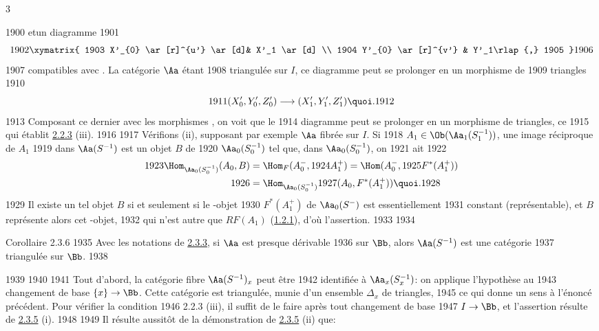 3	\documentclass[10pt]{../fichiers-configuration-latex/smfart}
\begin{document}
  1900	et\pageoriginale un diagramme
  1901	\[
  1902	\xymatrix{
  1903	X'_{0}  \ar[r]^{u'} \ar[d]& X'_1 \ar[d] \\
  1904	Y'_{0}  \ar[r]^{v'} & Y'_1\rlap{,}
  1905	}
  1906	\]
  1907	compatibles avec . La catégorie $\Aa$ étant
  1908	triangulée sur $I$, ce diagramme peut se prolonger en un morphisme de
  1909	triangles
  1910	\[
  1911	(X'_0,Y'_0,Z'_0)\longrightarrow (X'_1, Y'_1, Z'_1){\quoi}.
  1912	\]
  1913	Composant ce dernier avec les morphismes , on voit que le
  1914	diagramme  peut se prolonger en un morphisme de triangles, ce
  1915	qui établit \hyperref[XVII.def2.2.3]{2.2.3} (iii).
  1916	
  1917	Vérifions (ii), supposant par exemple $\Aa$ fibrée sur $I$. Si
  1918	$A_1\in \Ob (\Aa_1(S^{-1}_1))$, une image réciproque de $A_1$
  1919	dans $\Aa(S^{-1})$ est un objet $B$ de
  1920	$\Aa_0(S^{-1}_0)$ tel que, dans $\Aa_0(S^{-1}_0)$, on
  1921	ait
  1922	\begin{align*}
  1923	\Hom_{\Aa_0(S^{-1}_0)}(A_0,B) & =\Hom_F(A^{-}_0,
  1924	A^{+}_1)=\Hom(A^{-}_0,
  1925	F^{\ast}(A^{+}_1))\\
  1926	&=\Hom_{\Aa_0(S^{-1}_0)}
  1927	(A_0,F^{\ast}(A^{+}_1)){\quoi}.
  1928	\end{align*}
  1929	Il existe un tel objet $B$ si et seulement si le \iInd-objet
  1930	$F^{\ast}(A^{+}_1)$ de $\Aa_0(S^{-})$ est essentiellement
  1931	constant (\ie représentable), et $B$ représente alors cet \iind-objet,
  1932	qui n'est autre que $RF(A_1)$ (\hyperref[XVII.def1.2.1]{1.2.1}), d'où l'assertion.
  1933	
  1934	\begin{enonce*}{Corollaire 2.3.6}
  1935	Avec les notations de \hyperref[XVII.def2.3.3]{2.3.3}, si $\Aa$ est presque dérivable
  1936	sur $\Bb$, alors $\Aa(S^{-1})$ est une catégorie
  1937	triangulée sur $\Bb$.
  1938	\end{enonce*}
  1939	
  1940	
  1941	Tout d'abord, la catégorie fibre $\Aa(S^{-1})_x$ peut être
  1942	identifiée à $\Aa_x(S^{-1}_x)$: on applique l'hypothèse au
  1943	changement de base $\{x\}\rightarrow \Bb$. Cette	catégorie est triangulée, munie d'un ensemble $\Delta_x$ de triangles,
  1945	ce qui donne un sens à l'énoncé précédent. Pour vérifier la condition
  1946	2.2.3 (iii), il suffit de le faire après tout changement de base
  1947	$I\rightarrow \Bb$, et l'assertion résulte de \hyperref[XVII.prop2.3.5]{2.3.5} (i).
  1948	
  1949	Il résulte aussitôt de la démonstration de \hyperref[XVII.prop2.3.5]{2.3.5} (ii) que:
\end{document}
